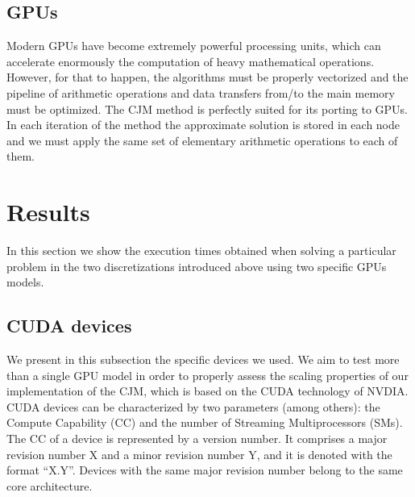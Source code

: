 \documentclass[preprint,12pt]{elsarticle}
\begin{document}
  
\subsection{GPUs}
\label{subsec:cheJacMet}

Modern
  GPUs have become extremely powerful processing units, which can
  accelerate enormously the computation of heavy mathematical
  operations. However, for that to happen, the algorithms must be
  properly vectorized and the pipeline of arithmetic operations and
  data transfers from/to the main memory must be optimized. The CJM method
  is perfectly suited for its porting to GPUs.  In each iteration of the
method the approximate solution is stored in each node
and we must apply the same set of elementary arithmetic operations to
each of them.


\section{Results}
\label{sec:res}

In this section we show the execution times obtained when solving a
particular problem in the two discretizations introduced above using
two specific GPUs models.

\subsection{CUDA devices}
\label{subsec:gpuDev}

We present in this subsection the specific devices we used. We aim to test more than a single GPU model in order
  to properly assess the scaling properties of our implementation of
  the CJM, which is based on the CUDA \cite{CUDA} technology of
NVDIA. CUDA devices
can be characterized by two parameters (among others):
the Compute Capability (CC) and the number of Streaming
Multiprocessors (SMs). The CC of a device is
represented by a version number. It comprises a major revision number
X and a minor revision number Y, and it is denoted with the format
``X.Y''. Devices with the same major revision number belong to the same core architecture.
\end{document}
